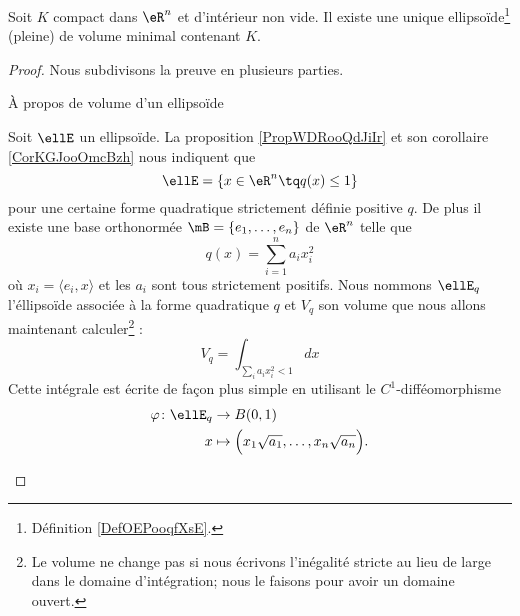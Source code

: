 \begin{proposition}   \label{PropJYVooRMaPok}
    Soit \( K\) compact dans \( \eR^n\) et d'intérieur non vide. Il existe une unique ellipsoïde\footnote{Définition \ref{DefOEPooqfXsE}.} (pleine) de volume minimal contenant \( K\).
\end{proposition}

\begin{proof}
    Nous subdivisons la preuve en plusieurs parties.
    \begin{subproof}
        \item[À propos de volume d'un ellipsoïde]

            Soit \( \ellE\) un ellipsoïde. La proposition \ref{PropWDRooQdJiIr} et son corollaire \ref{CorKGJooOmcBzh} nous indiquent que 
            \begin{equation}
                \ellE=\{ x\in \eR^n\tq q(x)\leq 1 \}
            \end{equation}
            pour une certaine forme quadratique strictement définie positive \( q\). De plus il existe une base orthonormée \( \mB=\{ e_1,\ldots, e_n \}\) de \( \eR^n\) telle que 
            \begin{equation}    \label{EqELBooQLPQUj}
                q(x)=\sum_{i=1}^na_ix_i^2
            \end{equation}
            où \( x_i=\langle e_i, x\rangle \) et les \( a_i\) sont tous strictement positifs. Nous nommons \( \ellE_q\) l'éllipsoïde associée à la forme quadratique \( q\) et \( V_q\) son volume que nous allons maintenant calculer\footnote{Le volume ne change pas si nous écrivons l'inégalité stricte au lieu de large dans le domaine d'intégration; nous le faisons pour avoir un domaine ouvert.} :
            \begin{equation}
                V_q=\int_{\sum_ia_ix_i^2<1}dx
            \end{equation}
            Cette intégrale est écrite de façon plus simple en utilisant le \( C^1\)-difféomorphisme
            \begin{equation}
                \begin{aligned}
                    \varphi\colon \ellE_q&\to B(0,1) \\
                    x&\mapsto \Big( x_1\sqrt{a_1},\ldots, x_n\sqrt{a_n} \Big). 
                \end{aligned}
            \end{equation}

\end{subproof}
\end{proof}
